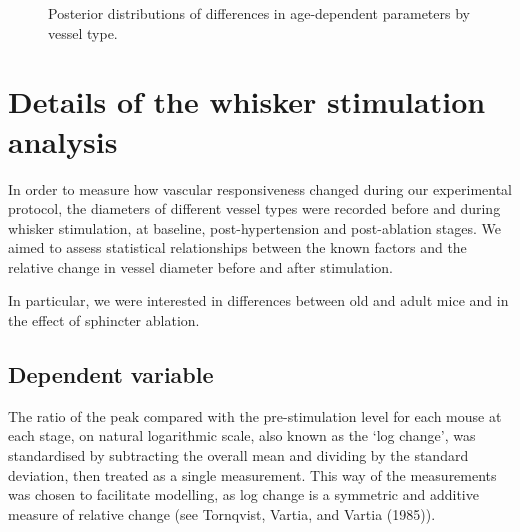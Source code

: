 \documentclass[
  letterpaper,
  DIV=11,
  numbers=noendperiod,
  oneside]{scrartcl}
\theoremstyle{plain}
\theoremstyle{remark}
\begin{document}
\begin{figure}


\caption{\label{fig-density-effects}Posterior distributions of
differences in age-dependent parameters by vessel type.}

\end{figure}%

\section{Details of the whisker stimulation
analysis}\label{details-of-the-whisker-stimulation-analysis}

In order to measure how vascular responsiveness changed during our
experimental protocol, the diameters of different vessel types were
recorded before and during whisker stimulation, at baseline,
post-hypertension and post-ablation stages. We aimed to assess
statistical relationships between the known factors and the relative
change in vessel diameter before and after stimulation.

In particular, we were interested in differences between old and adult
mice and in the effect of sphincter ablation.

\subsection{Dependent variable}\label{dependent-variable}

The ratio of the peak compared with the pre-stimulation level for each
mouse at each stage, on natural logarithmic scale, also known as the
`log change', was standardised by subtracting the overall mean and
dividing by the standard deviation, then treated as a single
measurement. This way of the measurements was chosen to facilitate
modelling, as log change is a symmetric and additive measure of relative
change (see Tornqvist, Vartia, and Vartia (1985)).
\end{document}
